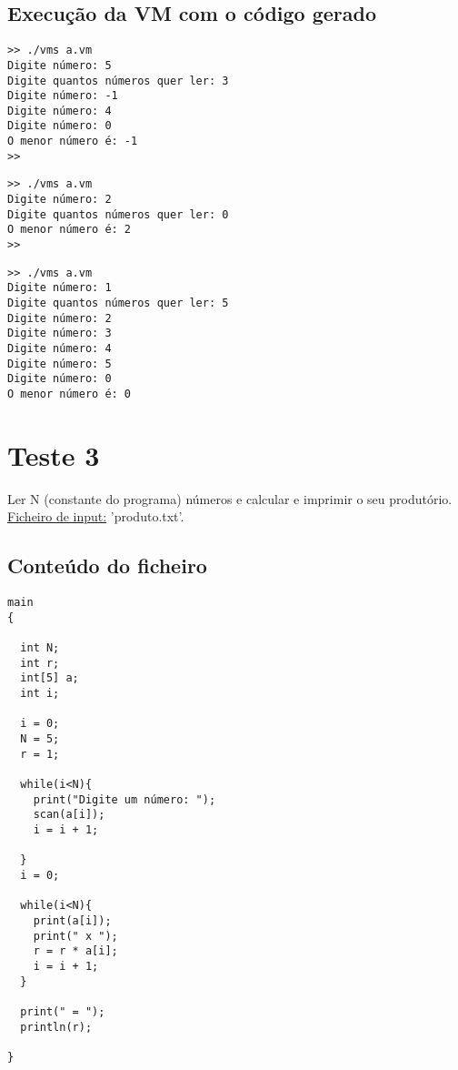 \documentclass[11pt,a4paper]{report}%
\begin{document}
\subsection{Execução da VM com o código gerado}

\begin{verbatim}
>> ./vms a.vm
Digite número: 5
Digite quantos números quer ler: 3
Digite número: -1
Digite número: 4
Digite número: 0
O menor número é: -1
>>
\end{verbatim}

\begin{verbatim}
>> ./vms a.vm
Digite número: 2
Digite quantos números quer ler: 0
O menor número é: 2
>>
\end{verbatim}

\begin{verbatim}
>> ./vms a.vm
Digite número: 1
Digite quantos números quer ler: 5
Digite número: 2
Digite número: 3
Digite número: 4
Digite número: 5
Digite número: 0
O menor número é: 0
\end{verbatim}

\section{Teste 3}
Ler N (constante do programa) números e calcular e imprimir o seu produtório. \\
\underline{Ficheiro de input:} 'produto.txt'.

\subsection{Conteúdo do ficheiro}

\begin{verbatim}
main
{
  
  int N;
  int r;
  int[5] a;
  int i;

  i = 0;
  N = 5;
  r = 1;
  
  while(i<N){
    print("Digite um número: ");
    scan(a[i]);
    i = i + 1;

  }
  i = 0;

  while(i<N){
    print(a[i]);
    print(" x ");
    r = r * a[i];
    i = i + 1;
  }
  
  print(" = ");
  println(r);

}
\end{verbatim}
\end{document}

